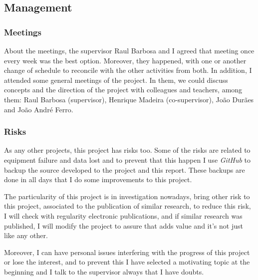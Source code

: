 \subsection{Management}

\subsubsection{Meetings}

About the meetings, the supervisor Raul Barbosa and I agreed that meeting once every week was the best option. Moreover, they happened, with one or another change of schedule to reconcile with the other activities from both. In addition, I attended some general meetings of the project. In them, we could discuss concepts and the direction of the project with colleagues and teachers, among them: Raul Barbosa (supervisor), Henrique Madeira (co-supervisor), João Durães and João André Ferro.

\subsubsection{Risks}

As any other projects, this project has risks too.
Some of the risks are related to equipment failure and data lost and to prevent that this happen I use \textit{GitHub} to backup the source developed to the project and this report. These backups are done in all days that I do some improvements to this project.

The particularity of this project is in investigation nowadays, bring other risk to this project, associated to the publication of similar research, to reduce this risk, I will check with regularity electronic publications, and if similar research was published, I will modify the project to assure that adds value and it's not just like any other.

Moreover, I can have personal issues interfering with the progress of this project or lose the interest, and to prevent this I have selected a motivating topic at the beginning and I talk to the supervisor always that I have doubts.

